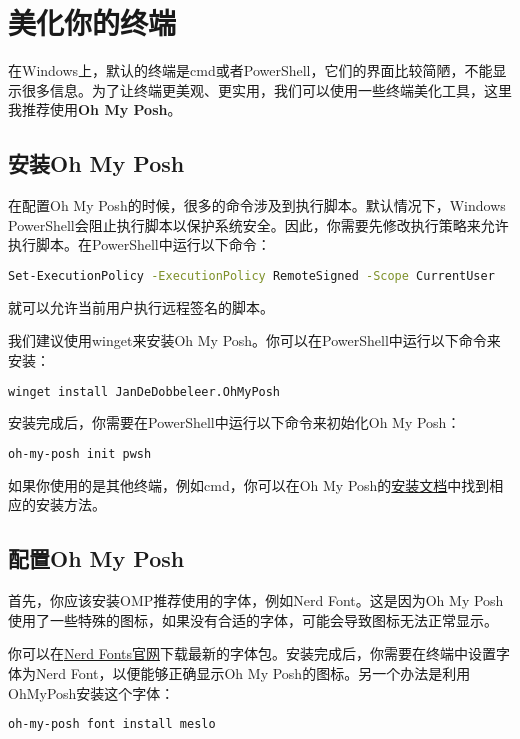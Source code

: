 \section{美化你的终端}

在Windows上，默认的终端是cmd或者PowerShell，它们的界面比较简陋，不能显示很多信息。为了让终端更美观、更实用，我们可以使用一些终端美化工具，这里我推荐使用\textbf{Oh My Posh}。

\subsection{安装Oh My Posh}

\begin{tip}
  在配置Oh My Posh的时候，很多的命令涉及到执行脚本。默认情况下，Windows PowerShell会阻止执行脚本以保护系统安全。因此，你需要先修改执行策略来允许执行脚本。在PowerShell中运行以下命令：
\begin{lstlisting}[language=bash]
  Set-ExecutionPolicy -ExecutionPolicy RemoteSigned -Scope CurrentUser
\end{lstlisting}
  就可以允许当前用户执行远程签名的脚本。
\end{tip}

我们建议使用winget来安装Oh My Posh。你可以在PowerShell中运行以下命令来安装：

\begin{lstlisting}[language=bash]
  winget install JanDeDobbeleer.OhMyPosh
\end{lstlisting}

安装完成后，你需要在PowerShell中运行以下命令来初始化Oh My Posh：
\begin{lstlisting}[language=bash]
  oh-my-posh init pwsh
\end{lstlisting}

如果你使用的是其他终端，例如cmd，你可以在Oh My Posh的\href{https://ohmyposh.dev/docs/installation}{安装文档}中找到相应的安装方法。

\subsection{配置Oh My Posh}

首先，你应该安装OMP推荐使用的字体，例如Nerd Font。这是因为Oh My Posh使用了一些特殊的图标，如果没有合适的字体，可能会导致图标无法正常显示。

你可以在\href{https://www.nerdfonts.com/}{Nerd Fonts官网}下载最新的字体包。安装完成后，你需要在终端中设置字体为Nerd Font，以便能够正确显示Oh My Posh的图标。另一个办法是利用OhMyPosh安装这个字体：
\begin{lstlisting}[language=bash]
  oh-my-posh font install meslo
\end{lstlisting}

